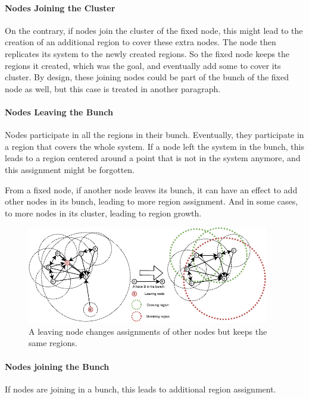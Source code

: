 \documentclass[a4paper,11pt,twoside=semi,openright]{report}
\begin{document}
\paragraph{Nodes Joining the Cluster} On the contrary, if nodes join the
cluster of the fixed node, this might lead to the creation of an additional
region to cover these extra nodes. The node then replicates its system to
the newly created regions. So the fixed node keeps the regions it created,
which was the goal, and eventually add some to cover its cluster.  By design,
these joining nodes could be part of the bunch of the fixed node as well, but
this case is treated in another paragraph.

\paragraph{Nodes Leaving the Bunch} Nodes participate in all the regions in
their bunch. Eventually, they participate in a region that covers the
whole system. If a node left the system in the bunch, this leads to a region
centered around a point that is not in the system anymore, and this assignment
might be forgotten. 

From a fixed node, if another node leaves its bunch, it can have an effect to
add other nodes in its bunch, leading to more region assignment. And in some
cases, to more nodes in its cluster, leading to region growth. 

\begin{figure}[!h] \centering
  \includegraphics[width=300pt]{figures/LocarnoTreaties-Leaving-cluster}
  \caption{A leaving node changes assignments of other nodes but keeps the
  same regions. }
\label{fig:LocarnoTreaties-Leaving-cluster} \end{figure}

\paragraph{Nodes joining the Bunch} If nodes are joining in a bunch, this leads
to additional region assignment. 
\end{document}
